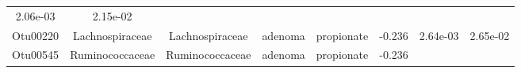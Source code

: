 \documentclass[11pt,]{article}
\begin{document}
\begin{longtable}[]{@{}cccccccc@{}}
\begin{minipage}[t]{0.08\columnwidth}
2.06e-03\strut
\end{minipage} & \begin{minipage}[t]{0.08\columnwidth}\centering\strut
2.15e-02\strut
\end{minipage}\tabularnewline
\begin{minipage}[t]{0.08\columnwidth}\centering\strut
Otu00220\strut
\end{minipage} & \begin{minipage}[t]{0.15\columnwidth}\centering\strut
Lachnospiraceae\strut
\end{minipage} & \begin{minipage}[t]{0.15\columnwidth}\centering\strut
Lachnospiraceae\strut
\end{minipage} & \begin{minipage}[t]{0.08\columnwidth}\centering\strut
adenoma\strut
\end{minipage} & \begin{minipage}[t]{0.09\columnwidth}\centering\strut
propionate\strut
\end{minipage} & \begin{minipage}[t]{0.07\columnwidth}\centering\strut
-0.236\strut
\end{minipage} & \begin{minipage}[t]{0.08\columnwidth}\centering\strut
2.64e-03\strut
\end{minipage} & \begin{minipage}[t]{0.08\columnwidth}\centering\strut
2.65e-02\strut
\end{minipage}\tabularnewline
\begin{minipage}[t]{0.08\columnwidth}\centering\strut
Otu00545\strut
\end{minipage} & \begin{minipage}[t]{0.15\columnwidth}\centering\strut
Ruminococcaceae\strut
\end{minipage} & \begin{minipage}[t]{0.15\columnwidth}\centering\strut
Ruminococcaceae\strut
\end{minipage} & \begin{minipage}[t]{0.08\columnwidth}\centering\strut
adenoma\strut
\end{minipage} & \begin{minipage}[t]{0.09\columnwidth}\centering\strut
propionate\strut
\end{minipage} & \begin{minipage}[t]{0.07\columnwidth}\centering\strut
-0.236\strut
\end{minipage} & \begin{minipage}[t]{0.08\columnwidth}\centering\strut

\end{minipage}
\end{longtable}
\end{document}
